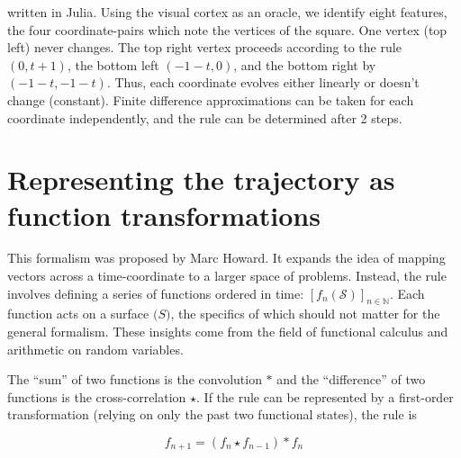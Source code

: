 \documentclass[]{article}
\begin{document}
written in Julia. Using the visual cortex as an oracle, we identify eight features, the four coordinate-pairs which note the vertices of the square. One vertex (top left) never changes. The top right vertex proceeds according to the rule $(0, t + 1)$, the bottom left $(-1-t, 0)$, and the bottom right by $(-1-t, -1-t)$. Thus, each coordinate evolves either linearly or doesn't change (constant). Finite difference approximations can be taken for each coordinate independently, and the rule can be determined after 2 steps.

\section{Representing the trajectory as function transformations}

This formalism was proposed by Marc Howard. It expands the idea of mapping vectors across a time-coordinate to a larger space of problems. Instead, the rule involves defining a series of functions ordered in time: $\left[ f_n(\mathcal{S}) \right]_{n \in \mathbb{N}}$. Each function acts on a surface $\mathcal(S)$, the specifics of which should not matter for the general formalism. These insights come from the field of functional calculus and arithmetic on random variables.

The ``sum'' of two functions is the convolution $*$ and the ``difference'' of two functions is the cross-correlation $\star$. If the rule can be represented by a first-order transformation (relying on only the past two functional states), the rule is

\begin{equation}
	f_{n + 1} = \left( f_n \star f_{n-1} \right) * f_n
\end{equation}
\end{document}
